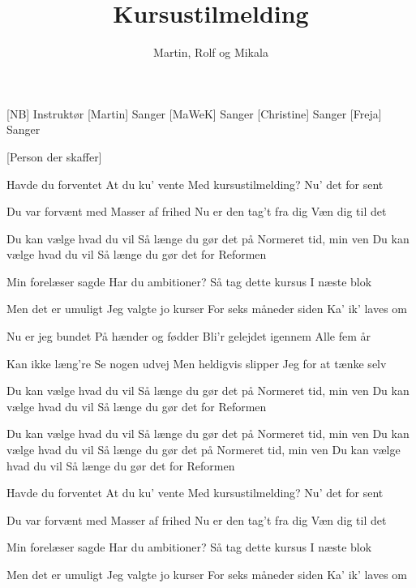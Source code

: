 \documentclass[a4paper,11pt]{article}
\title{Kursustilmelding}
\author{Martin, Rolf og Mikala}
\begin{document}
\maketitle

\begin{roles}
[NB] Instruktør
[Martin] Sanger
[MaWeK] Sanger
[Christine] Sanger
[Freja] Sanger
\end{roles}

\begin{props}
[Person der skaffer]
\end{props}

\begin{song}
Havde du forventet
At du ku' vente
Med kursustilmelding?
Nu' det for sent

Du var forvænt med
Masser af frihed
Nu er den tag't fra dig
Væn dig til det

Du kan vælge hvad du vil
Så længe du gør det på
Normeret tid, min ven
Du kan vælge hvad du vil
Så længe du gør det for
Reformen

Min forelæser sagde
Har du ambitioner?
Så tag dette kursus
I næste blok

Men det er umuligt
Jeg valgte jo kurser
For seks måneder siden
Ka' ik' laves om

Nu er jeg bundet
På hænder og fødder
Bli'r gelejdet igennem
Alle fem år

Kan ikke læng're
Se nogen udvej
Men heldigvis slipper
Jeg for at tænke selv

Du kan vælge hvad du vil
Så længe du gør det på
Normeret tid, min ven
Du kan vælge hvad du vil
Så længe du gør det for
Reformen

Du kan vælge hvad du vil
Så længe du gør det på
Normeret tid, min ven
Du kan vælge hvad du vil
Så længe du gør det på
Normeret tid, min ven
Du kan vælge hvad du vil
Så længe du gør det for
Reformen

Havde du forventet
At du ku' vente
Med kursustilmelding?
Nu' det for sent

Du var forvænt med
Masser af frihed
Nu er den tag't fra dig
Væn dig til det

Min forelæser sagde
Har du ambitioner?
Så tag dette kursus
I næste blok

Men det er umuligt
Jeg valgte jo kurser
For seks måneder siden
Ka' ik' laves om
\end{song}
\end{document}
